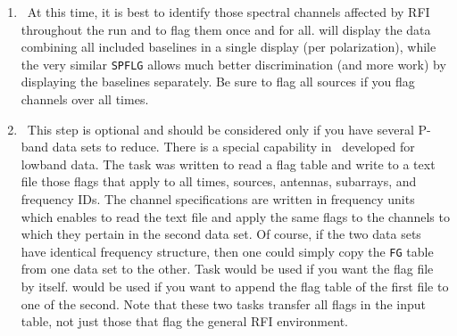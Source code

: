 \begin{enumerate}
\item\ At this time, it is best to identify those spectral channels
  affected by RFI throughout the run and to flag them once and for
  all.  {\tt {}} will display the data combining all
  included baselines in a single display (per polarization), while the
  very similar {\tt SPFLG} allows much better discrimination (and more
  work) by displaying the baselines separately.  Be sure to flag all
  sources if you flag channels over all times.

\vfill\eject
\item\ This step is optional and should be considered only if you have
  several P-band data sets to reduce.  There is a special capability
  in \AIPS\ developed for lowband data.  The task {\tt {}}
  was written to read a flag table and write to a text file those
  flags that apply to all times, sources, antennas, subarrays, and
  frequency IDs.  The channel specifications are written in frequency
  units which enables {\tt {}} to read the text file and
  apply the same flags to the channels to which they pertain in the
  second data set.  Of course, if the two data sets have identical
  frequency structure, then one could simply copy the {\tt FG} table
  from one data set to the other.  Task {\tt {}} would be
  used if you want the flag file by itself.  {\tt {}} would
  be used if you want to append the flag table of the first file to
  one of the second.  Note that these two tasks transfer all flags in
  the input table, not just those that flag the general RFI
  environment.


\end{enumerate}
